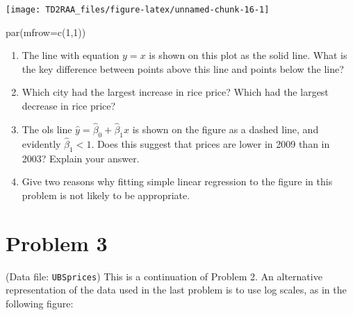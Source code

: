 \documentclass[
]{article}
\newenvironment{Shaded}{\begin{snugshade}}{\end{snugshade}}
\newcommand{\AttributeTok}[1]{\textcolor[rgb]{0.77,0.63,0.00}{#1}}
\newcommand{\DecValTok}[1]{\textcolor[rgb]{0.00,0.00,0.81}{#1}}
\newcommand{\FunctionTok}[1]{\textcolor[rgb]{0.00,0.00,0.00}{#1}}
\newcommand{\NormalTok}[1]{#1}
\begin{document}
\begin{center}\texttt{[image: TD2RAA\_files/figure-latex/unnamed-chunk-16-1]} \end{center}

\begin{Shaded}
\begin{Highlighting}[]
\FunctionTok{par}\NormalTok{(}\AttributeTok{mfrow=}\FunctionTok{c}\NormalTok{(}\DecValTok{1}\NormalTok{,}\DecValTok{1}\NormalTok{))}
\end{Highlighting}
\end{Shaded}

\begin{enumerate}
\def\labelenumi{\alph{enumi}.}
\item
  The line with equation \(y = x\) is shown on this plot as the solid
  line. What is the key difference between points above this line and
  points below the line?
\item
  Which city had the largest increase in rice price? Which had the
  largest decrease in rice price?
\item
  The ols line \(\hat{y}=\hat{\beta}_0+\hat{\beta}_1x\) is shown on the
  figure as a dashed line, and evidently \(\hat{\beta}_1 <1\). Does this
  suggest that prices are lower in 2009 than in 2003? Explain your
  answer.
\item
  Give two reasons why fitting simple linear regression to the figure in
  this problem is not likely to be appropriate.
\end{enumerate}

\hypertarget{problem-3}{%
\section{Problem 3}\label{problem-3}}

(Data file: \texttt{UBSprices}) This is a continuation of Problem 2. An
alternative representation of the data used in the last problem is to
use log scales, as in the following figure:
\end{document}
